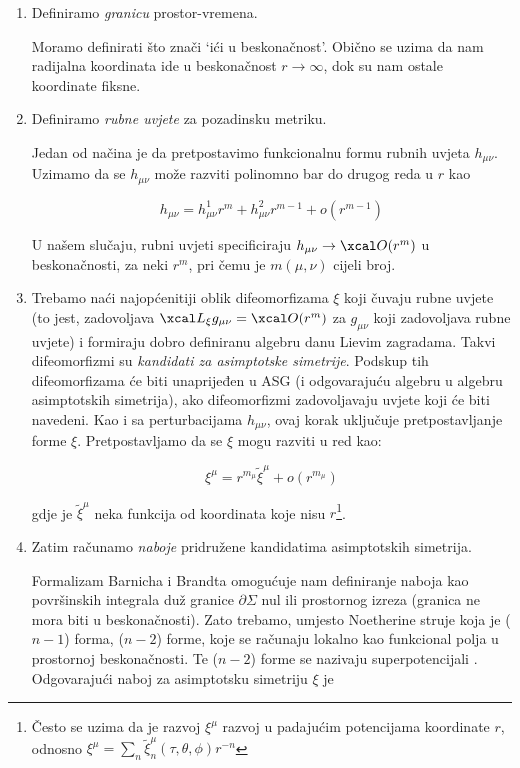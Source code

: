\begin{enumerate}
\item Definiramo \textit{granicu} prostor-vremena. 

Moramo definirati što znači `ići u beskonačnost'. Obično se uzima da nam radijalna koordinata ide u beskonačnost $r\to\infty$, dok su nam ostale koordinate fiksne.

\item Definiramo \textit{rubne uvjete} za pozadinsku metriku.

Jedan od načina je da pretpostavimo funkcionalnu formu rubnih uvjeta $h_{\mu\nu}$. Uzimamo da se $h_{\mu\nu}$ može razviti polinomno bar do drugog reda u $r$ kao 

\begin{equation*}
h_{\mu\nu}=h_{\mu\nu}^1r^m+h_{\mu\nu}^2r^{m-1}+o(r^{m-1})
\end{equation*}

U našem slučaju, rubni uvjeti specificiraju $h_{\mu\nu}\to \bigo(r^m)$ u beskonačnosti, za neki $r^m$, pri čemu je $m(\mu,\nu)$ cijeli broj.

\item Trebamo naći najopćenitiji oblik difeomorfizama $\xi$ koji čuvaju rubne uvjete (to jest, zadovoljava $\Lie_\xi g_{\mu\nu}=\bigo(r^m)$ za $g_{\mu\nu}$ koji zadovoljava rubne uvjete) i formiraju dobro definiranu algebru danu Lievim zagradama. Takvi difeomorfizmi su \textit{kandidati za asimptotske simetrije}. Podskup tih difeomorfizama će biti unaprijeđen u ASG (i odgovarajuću algebru u algebru asimptotskih simetrija), ako difeomorfizmi zadovoljavaju uvjete koji će biti navedeni. Kao i sa perturbacijama $h_{\mu\nu}$, ovaj korak uključuje pretpostavljanje forme $\xi$. Pretpostavljamo da se $\xi$ mogu razviti u red kao:

\begin{equation*}
\xi^\mu=r^{m_\mu}\tilde{\xi}^\mu +o(r^{m_\mu})
\end{equation*}

\noindent gdje je $\tilde{\xi}^\mu$ neka funkcija od koordinata koje nisu $r$\footnote{Često se uzima da je razvoj $\xi^\mu$ razvoj u padajućim potencijama koordinate $r$, odnosno $\xi^\mu=\sum_n\tilde{\xi}^\mu_n(\tau,\theta,\phi)r^{-n}$}.

\item Zatim računamo \textit{naboje} pridružene kandidatima asimptotskih simetrija.

Formalizam Barnicha i Brandta \citep{Barnich:2001jy} omogućuje nam definiranje naboja kao površinskih integrala duž granice $\partial\Sigma$ nul ili prostornog izreza (granica ne mora biti u beskonačnosti). Zato trebamo, umjesto Noetherine struje koja je ($n-1$) forma, ($n-2$) forme, koje se računaju lokalno kao funkcional polja u prostornoj beskonačnosti. Te ($n-2$) forme se nazivaju superpotencijali \citep{Silva:1998ii}.
Odgovarajući naboj za asimptotsku simetriju $\xi$ je 


\end{enumerate}
